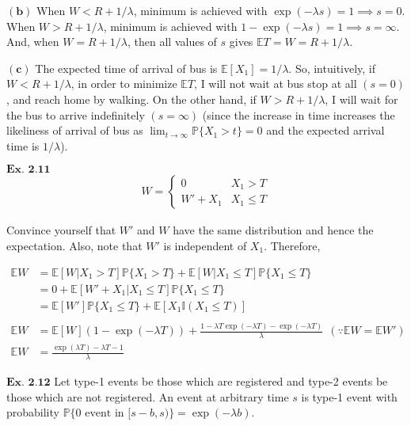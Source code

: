 \documentclass{article}
\begin{document}
$\mathbf{(b)}$
When $W < R+1/\lambda$, minimum is achieved with $\exp(-\lambda s) = 1 \implies s = 0$. When $W > R+1/\lambda$, minimum is achieved with $1-\exp(-\lambda s) = 1 \implies s = \infty$. And, when $W = R+1/\lambda$, then all values of $s$ gives $\mathbb{E}T = W = R+1/\lambda$.

$\mathbf{(c)}$
The expected time of arrival of bus is $\mathbb{E}[X_1] = 1/\lambda$. So, intuitively, if $W < R+1/\lambda$, in order to minimize $\mathbb{E}T$, I will not wait at bus stop at all $(s=0)$, and reach home by walking. On the other hand, if $W > R+1/\lambda$, I will wait for the bus to arrive indefinitely $(s=\infty)$ (since the increase in time increases the likeliness of arrival of bus as $\lim_{t\rightarrow\infty}\mathbb{P}\{X_1 > t\} = 0$ and the expected arrival time is $1/\lambda$).


\vspace{0.2in}
${\textbf{Ex. 2.11}}$
\begin{align*}
W = \left\{\begin{matrix}0 & X_1 > T\\ W' + X_1 & X_1 \leq T\end{matrix}\right.
\end{align*}

Convince yourself that $W'$ and $W$ have the same distribution and hence the expectation. Also, note that $W'$ is independent of $X_1$. Therefore,

\begin{align*}
\mathbb{E}W &= \mathbb{E}[W|X_1>T]\mathbb{P}\{X_1 > T\} + \mathbb{E}[W|X_1 \leq T]\mathbb{P}\{X_1 \leq T\}\\
&= 0 + \mathbb{E}[W'+X_1|X_1\leq T]\mathbb{P}\{X_1 \leq T\}\\
&= \mathbb{E}[W']\mathbb{P}\{X_1\leq T\} + \mathbb{E}[X_1\mathbb{I}(X_1\leq T)]\\\\
\mathbb{E}W &= \mathbb{E}[W](1-\exp(-\lambda T)) + \frac{1-\lambda T\exp(-\lambda T) - \exp(-\lambda T)}{\lambda}\ \ (\because \mathbb{E}W = \mathbb{E}W')\\
\mathbb{E}W &= \frac{\exp(\lambda T) -\lambda T - 1}{\lambda} 
\end{align*}

\vspace{0.2in}
${\textbf{Ex. 2.12}}$
Let type-1 events be those which are registered and type-2 events be those which are not registered. An event at arbitrary time $s$ is type-1 event with probability $\mathbb{P}\{\text{0 event in }[s-b,s)\} = \exp(-\lambda b)$.
\end{document}
